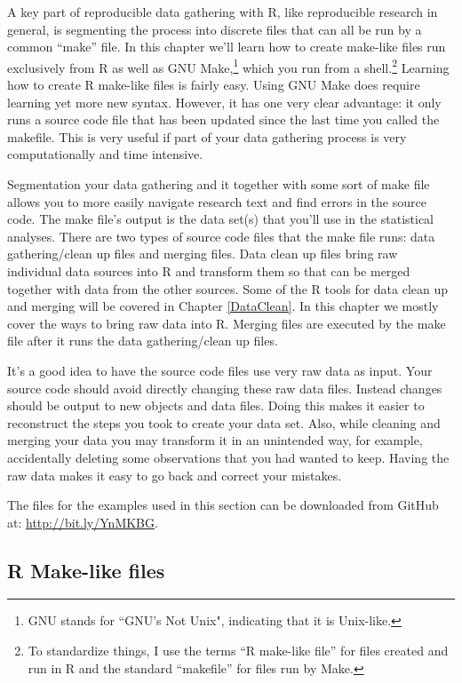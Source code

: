 A key part of reproducible data gathering with R, like reproducible research in general, is segmenting the process into discrete files that can all be run by a common ``make'' file. In this chapter we'll learn how to create make-like files run exclusively from R as well as GNU Make,\footnote{GNU stands for ``GNU's Not Unix", indicating that it is Unix-like.} which you run from a shell.\footnote{To standardize things, I use the terms ``R make-like file'' for files created and run in R and the standard ``makefile'' for files run by Make.} Learning how to create R make-like files is fairly easy. Using GNU Make does require learning yet more new syntax. However, it has one very clear advantage: it only runs a source code file that has been updated since the last time you called the makefile. This is very useful if part of your data gathering process is very computationally and time intensive.

Segmentation your data gathering and it together with some sort of make file allows you to more easily navigate research text and find errors in the source code. The make file's output is the data set(s) that you'll use in the statistical analyses. There are two types of source code files that the make file runs: data gathering/clean up files and merging files. Data clean up files bring raw individual data sources into R and transform them so that can be merged together with data from the other sources. Some of the R tools for data clean up and merging will be covered in Chapter \ref{DataClean}. In this chapter we mostly cover the ways to bring raw data into R. Merging files are executed by the make file after it runs the data gathering/clean up files.

It's a good idea to have the source code files use very raw data as input. Your source code should avoid directly changing these raw data files. Instead changes should be output to new objects and data files. Doing this makes it easier to reconstruct the steps you took to create your data set. Also, while cleaning and merging your data you may transform it in an unintended way, for example, accidentally deleting some observations that you had wanted to keep. Having the raw data makes it easy to go back and correct your mistakes. 

The files for the examples used in this section can be downloaded from GitHub at: \url{http://bit.ly/YnMKBG}.

\subsection{R Make-like files}

